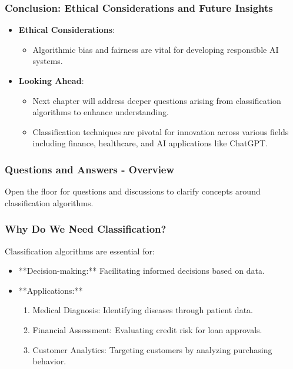 \documentclass[aspectratio=169]{beamer}
\begin{document}
\begin{frame}[fragile]
    \frametitle{Conclusion: Ethical Considerations and Future Insights}
    \begin{itemize}
        \item \textbf{Ethical Considerations}:
        \begin{itemize}
            \item Algorithmic bias and fairness are vital for developing responsible AI systems.
        \end{itemize}
        \item \textbf{Looking Ahead}:
        \begin{itemize}
            \item Next chapter will address deeper questions arising from classification algorithms to enhance understanding.
            \item Classification techniques are pivotal for innovation across various fields including finance, healthcare, and AI applications like ChatGPT.
        \end{itemize}
    \end{itemize}
\end{frame}

\begin{frame}[fragile]
  \frametitle{Questions and Answers - Overview}
  Open the floor for questions and discussions to clarify concepts around classification algorithms.
\end{frame}

\begin{frame}[fragile]
  \frametitle{Why Do We Need Classification?}
  
  Classification algorithms are essential for:
  
  \begin{itemize}
    \item **Decision-making:** Facilitating informed decisions based on data.
    \item **Applications:**
    \begin{enumerate}
      \item Medical Diagnosis: Identifying diseases through patient data.
      \item Financial Assessment: Evaluating credit risk for loan approvals.
      \item Customer Analytics: Targeting customers by analyzing purchasing behavior.
    \end{enumerate}
  \end{itemize}
\end{frame}
\end{document}
